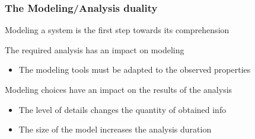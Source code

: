 
\begin{frame}[c]
  \frametitle{The Modeling/Analysis duality}

Modeling a system is the first step towards its comprehension

\begin{center}
\end{center}

\pause[2]
The required analysis has an impact on modeling
\begin{itemize}
  \item The modeling tools must be adapted to the observed properties
\end{itemize}

\pause[3]
\medskip
Modeling choices have an impact on the results of the analysis
\begin{itemize}
  \item The level of details changes the quantity of obtained info
  \item The size of the model increases the analysis duration
\end{itemize}

\pause[4]
\medskip
\begin{center}
\end{center}

\end{frame}



